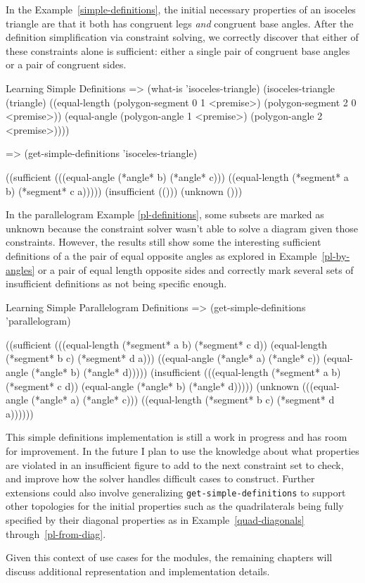 In the Example~\ref{simple-definitions}, the initial necessary
properties of an isoceles triangle are that it both has congruent
legs \emph{and} congruent base angles. After the definition
simplification via constraint solving, we correctly discover that
either of these constraints alone is sufficient: either a single pair
of congruent base angles or a pair of congruent sides.

\begin{repl-example}
[label=simple-definitions]
{Learning Simple Definitions}
=> (what-is 'isoceles-triangle)
(isoceles-triangle
 (triangle)
 ((equal-length (polygon-segment 0 1 <premise>)
                (polygon-segment 2 0 <premise>))
  (equal-angle (polygon-angle 1 <premise>) (polygon-angle 2 <premise>))))

=> (get-simple-definitions 'isoceles-triangle)

((sufficient
  (((equal-angle (*angle* b) (*angle* c)))
   ((equal-length (*segment* a b) (*segment* c a)))))
 (insufficient (()))
 (unknown ()))
\end{repl-example}

In the parallelogram Example \ref{pl-definitions}, some subsets are
marked as unknown because the constraint solver wasn't able to solve a
diagram given those constraints. However, the results still show some
the interesting sufficient definitions of a the pair of equal opposite
angles as explored in Example~\ref{pl-by-angles} or a pair of equal
length opposite sides and correctly mark several sets of insufficient
definitions as not being specific enough.

\begin{repl-example}
[label=pl-definitions]
{Learning Simple Parallelogram Definitions}
=> (get-simple-definitions 'parallelogram)

((sufficient
  (((equal-length (*segment* a b) (*segment* c d))
    (equal-length (*segment* b c) (*segment* d a)))
   ((equal-angle (*angle* a) (*angle* c))
    (equal-angle (*angle* b) (*angle* d)))))
 (insufficient
  (((equal-length (*segment* a b) (*segment* c d))
    (equal-angle (*angle* b) (*angle* d)))))
 (unknown
  (((equal-angle (*angle* a) (*angle* c)))
   ((equal-length (*segment* b c) (*segment* d a))))))
\end{repl-example}

This simple definitions implementation is still a work in progress and
has room for improvement. In the future I plan to use the knowledge
about what properties are violated in an insufficient figure to add to
the next constraint set to check, and improve how the solver handles
difficult cases to construct. Further extensions could also involve
generalizing \texttt{get-simple-definitions} to support other
topologies for the initial properties such as the quadrilaterals being
fully specified by their diagonal properties as in
Example~\ref{quad-diagonals} through~\ref{pl-from-diag}.

Given this context of use cases for the modules, the remaining
chapters will discuss additional representation and implementation
details.
